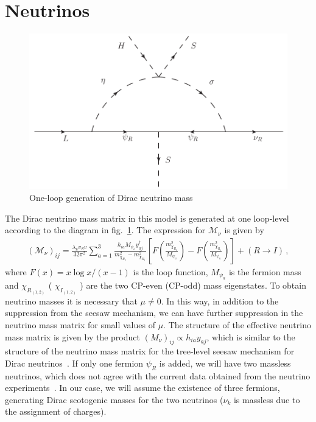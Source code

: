 \documentclass[12pt]{article}
\begin{document}
\section{Neutrinos}
\label{sec:Neutrinos}
%
\begin{figure}
\centering
\includegraphics[scale=0.75]{Neutrino_Loop.pdf}
\caption{One-loop generation of Dirac neutrino mass}
\label{fig:zee}
\end{figure}
%
 The Dirac neutrino mass matrix in this model is generated at one loop-level according to the diagram in  fig.~\ref{fig:zee}. The expression for $\mathcal{M}_{\nu}$ is given by~\cite{Reig:2018mdk}
%
\begin{align}
(\mathcal{M}_{\nu})_{ij} = \frac{\lambda_8 v_S v}{32 \pi^{2}} \sum_{a=1}^{3} \frac{h_{i a} M_{\psi_{a}}y^{\dagger}_{a j}} {m_{\chi_{R_2}}^{2}-m_{\chi_{R_1}}^{2}} \left[ F\left( \frac{m_{\chi_{R_2}}^{2}}{M_{\psi_{a}}} \right) - F\left( \frac{m_{\chi_{R_1}}^{2}}{M_{\psi_{a}}} \right) \right] + (R \to I)\,,
\end{align}
%
where $F(x) =x \log x/(x-1)$ is the loop function, $M_{\psi_{a}}$ is
the fermion mass and $\chi_{R_{(1,2)}}$ ( $\chi_{I_{(1,2)}}$ ) are the
two CP-even (CP-odd) mass eigenstates.
To obtain neutrino masses it is necessary that $\mu \neq 0$. In this
way, in addition to the suppression from the seesaw mechanism, we can
have further suppression in the neutrino mass matrix for small values
of $\mu$.
The structure of the effective neutrino mass matrix is given by the
product $(M_{\nu})_{ij} \propto h_{i a} y_{a j}$, which is similar to
the structure of the neutrino mass matrix for the tree-level seesaw
mechanism for Dirac neutrinos~\cite{Chulia:2016ngi}. If only one
fermion $\psi_R$ is added, we will have two massless neutrinos, which
does not agree with the current data obtained from the neutrino
experiments~\cite{deSalas:2017kay}. In our case, we will assume the
existence of three fermions, generating Dirac scotogenic masses for
the two neutrinos ($\nu_{k}$ is massless due to the assignment of
charges).
\end{document}
